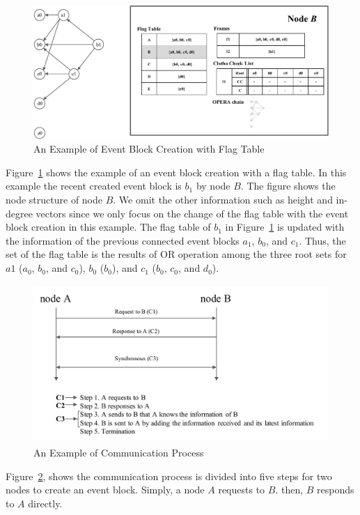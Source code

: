 \documentclass{article}
\begin{document}
\begin{figure} \centering  
\includegraphics[width=1.0\textwidth]{Ex_eventblock.pdf}
\caption{An Example of Event Block Creation with Flag Table}
\label{fig:ex_ebc}
\end{figure}

Figure~\ref{fig:ex_ebc} shows the example of an event block creation with a flag table. In this example the recent created event block is $b_1$ by node $B$. The figure shows the node structure of node $B$. We omit the other information such as height and in-degree vectors since we only focus on the change of the flag table with the event block creation in this example. The flag table of $b_1$ in Figure~\ref{fig:ex_ebc} is updated with the information of the previous connected event blocks $a_1$, $b_0$, and $c_1$. Thus, the set of the flag table is the 
results of OR operation among the three root sets for $a1$ ($a_0$, $b_0$, and $c_0$), $b_0$ ($b_0$), and $c_1$ ($b_0$, $c_0$, and $d_0$). 

\begin{figure} \centering  
\includegraphics[height=6cm, width=0.7\columnwidth]{sync.pdf}
\caption{An Example of Communication Process}
\label{fig:communication process}
\end{figure}

Figure~\ref{fig:communication process}, shows the communication process is divided into five steps for two nodes to create an event block. Simply, a node $A$ requests to $B$. then, $B$ responds to $A$ directly.
\end{document}
